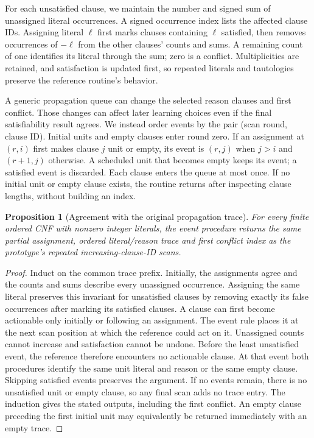 \documentclass[11pt,a4paper]{article}
\numberwithin{equation}{section}
\theoremstyle{plain}
\newtheorem{proposition}[lemma]{Proposition}
\theoremstyle{definition}
\theoremstyle{remark}
\begin{document}
For each unsatisfied clause, we maintain the number and signed sum of unassigned literal occurrences. A signed occurrence index lists the affected clause IDs. Assigning literal $\ell$ first marks clauses containing $\ell$ satisfied, then removes occurrences of $-\ell$ from the other clauses' counts and sums. A remaining count of one identifies its literal through the sum; zero is a conflict. Multiplicities are retained, and satisfaction is updated first, so repeated literals and tautologies preserve the reference routine's behavior.

A generic propagation queue can change the selected reason clauses and first conflict. Those changes can affect later learning choices even if the final satisfiability result agrees. We instead order events by the pair (scan round, clause ID). Initial units and empty clauses enter round zero. If an assignment at $(r,i)$ first makes clause $j$ unit or empty, its event is $(r,j)$ when $j>i$ and $(r+1,j)$ otherwise. A scheduled unit that becomes empty keeps its event; a satisfied event is discarded. Each clause enters the queue at most once. If no initial unit or empty clause exists, the routine returns after inspecting clause lengths, without building an index.

\begin{proposition}[Agreement with the original propagation trace]
\label{prop:ordered-propagation}
For every finite ordered CNF with nonzero integer literals, the event procedure returns the same partial assignment, ordered literal/reason trace and first conflict index as the prototype's repeated increasing-clause-ID scans.
\end{proposition}
\begin{proof}
Induct on the common trace prefix. Initially, the assignments agree and the counts and sums describe every unassigned occurrence. Assigning the same literal preserves this invariant for unsatisfied clauses by removing exactly its false occurrences after marking its satisfied clauses. A clause can first become actionable only initially or following an assignment. The event rule places it at the next scan position at which the reference could act on it. Unassigned counts cannot increase and satisfaction cannot be undone. Before the least unsatisfied event, the reference therefore encounters no actionable clause. At that event both procedures identify the same unit literal and reason or the same empty clause. Skipping satisfied events preserves the argument. If no events remain, there is no unsatisfied unit or empty clause, so any final scan adds no trace entry. The induction gives the stated outputs, including the first conflict. An empty clause preceding the first initial unit may equivalently be returned immediately with an empty trace.
\end{proof}
\end{document}
